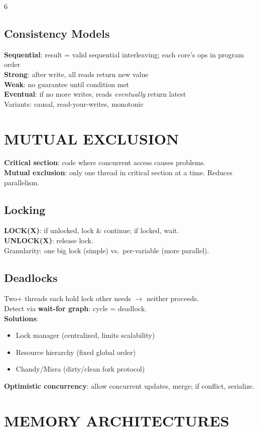 \documentclass[10pt,landscape,letterpaper]{article}
\newcommand{\concept}[1]{\textcolor{conceptcyan}{\textbf{#1}}}
\newcommand{\process}[1]{\textcolor{processpurple}{\textbf{#1}}}
\newcommand{\category}[1]{\textcolor{categorygreen}{\textbf{#1}}}
\begin{document}
\begin{multicols}{6}
\subsection{Consistency Models}
\category{Sequential}: result = valid sequential interleaving; each core's ops in program order\\
\category{Strong}: after write, all reads return new value\\
\category{Weak}: no guarantee until condition met\\
\category{Eventual}: if no more writes, reads \emph{eventually} return latest\\
Variants: causal, read-your-writes, monotonic

\section{MUTUAL EXCLUSION}
\concept{Critical section}: code where concurrent access causes problems.\\
\concept{Mutual exclusion}: only one thread in critical section at a time. Reduces parallelism.

\subsection{Locking}
\process{LOCK(X)}: if unlocked, lock \& continue; if locked, wait.\\
\process{UNLOCK(X)}: release lock.\\
Granularity: one big lock (simple) vs.\ per-variable (more parallel).

\subsection{Deadlocks}
Two+ threads each hold lock other needs $\to$ neither proceeds.\\
Detect via \concept{wait-for graph}: cycle = deadlock.\\
\category{Solutions}:
\begin{itemize}
\item Lock manager (centralized, limits scalability)
\item Resource hierarchy (fixed global order)
\item Chandy/Misra (dirty/clean fork protocol)
\end{itemize}
\concept{Optimistic concurrency}: allow concurrent updates, merge; if conflict, serialize.

\section{MEMORY ARCHITECTURES}

\end{multicols}
\end{document}
